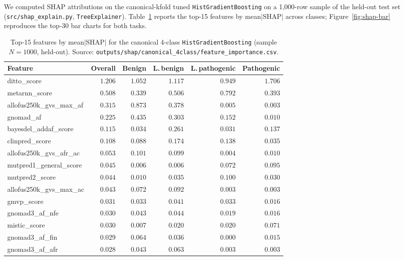 \documentclass[11pt,a4paper]{article}
\begin{document}
We computed SHAP attributions on the canonical-kfold tuned
\texttt{HistGradientBoosting} on a 1{,}000-row sample of the held-out
test set (\texttt{src/shap\_explain.py}, \texttt{TreeExplainer}).
Table~\ref{tab:shap-canonical} reports the top-15 features by
mean$|$SHAP$|$ across classes; Figure~\ref{fig:shap-bar} reproduces the
top-30 bar charts for both tasks.

\begin{table}[H]
\centering
\caption{Top-15 features by mean$|$SHAP$|$ for the canonical 4-class
\texttt{HistGradientBoosting} (sample $N=1000$, held-out). Source:
\texttt{outputs/shap/canonical\_4class/feature\_importance.csv}.}
\label{tab:shap-canonical}
\small
\begin{tabular}{lrrrrr}
\toprule
Feature & Overall & Benign & L.\,benign & L.\,pathogenic & Pathogenic \\
\midrule
ditto\_score                        & $1.206$ & $1.052$ & $1.117$ & $0.949$ & $1.706$ \\
metarnn\_score                      & $0.508$ & $0.339$ & $0.506$ & $0.792$ & $0.393$ \\
allofus250k\_gvs\_max\_af           & $0.315$ & $0.873$ & $0.378$ & $0.005$ & $0.003$ \\
gnomad\_af                          & $0.225$ & $0.435$ & $0.303$ & $0.152$ & $0.010$ \\
bayesdel\_addaf\_score              & $0.115$ & $0.034$ & $0.261$ & $0.031$ & $0.137$ \\
clinpred\_score                     & $0.108$ & $0.088$ & $0.174$ & $0.138$ & $0.035$ \\
allofus250k\_gvs\_afr\_ac           & $0.053$ & $0.101$ & $0.099$ & $0.004$ & $0.010$ \\
mutpred1\_general\_score            & $0.045$ & $0.006$ & $0.006$ & $0.072$ & $0.095$ \\
mutpred2\_score                     & $0.044$ & $0.010$ & $0.035$ & $0.100$ & $0.030$ \\
allofus250k\_gvs\_max\_ac           & $0.043$ & $0.072$ & $0.092$ & $0.003$ & $0.003$ \\
gmvp\_score                         & $0.031$ & $0.033$ & $0.041$ & $0.033$ & $0.016$ \\
gnomad3\_af\_nfe                    & $0.030$ & $0.043$ & $0.044$ & $0.019$ & $0.016$ \\
mistic\_score                       & $0.030$ & $0.007$ & $0.020$ & $0.020$ & $0.071$ \\
gnomad3\_af\_fin                    & $0.029$ & $0.064$ & $0.036$ & $0.000$ & $0.015$ \\
gnomad3\_af\_afr                    & $0.028$ & $0.043$ & $0.063$ & $0.003$ & $0.003$ \\
\bottomrule
\end{tabular}
\end{table}
\end{document}
